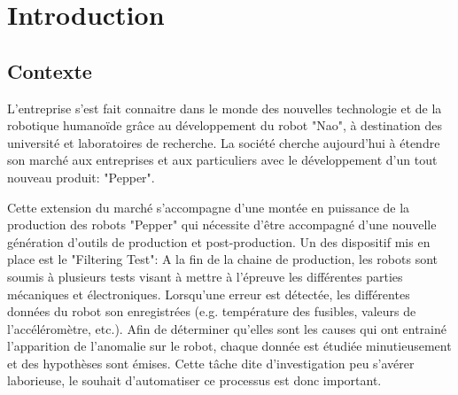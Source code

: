 \chapter{Introduction}
\label{Introduction}
\thispagestyle{fancy}

\section{Contexte}
\label{Introduction:Contexte}

 L'entreprise s'est fait connaitre dans le monde des nouvelles technologie et de la robotique humanoïde grâce au développement du robot "Nao", à destination des université et laboratoires de recherche. La société cherche aujourd'hui à étendre son marché aux entreprises et aux particuliers avec le développement d'un tout nouveau produit: "Pepper". 
 
 Cette extension du marché s'accompagne d'une montée en puissance de la production des robots "Pepper" qui nécessite d'être accompagné d'une nouvelle génération d'outils de production et post-production. Un des dispositif mis en place est le "Filtering Test": A la fin de la chaine de production, les robots sont soumis à plusieurs tests visant à mettre à l'épreuve les différentes parties mécaniques et électroniques. Lorsqu'une erreur est détectée,  les différentes données du robot son enregistrées (e.g. température des fusibles, valeurs de l'accéléromètre, etc.). Afin de déterminer qu'elles sont les causes qui ont entrainé l'apparition de l'anomalie sur le robot, chaque donnée est étudiée minutieusement et des hypothèses sont émises. Cette tâche dite d'investigation peu s'avérer laborieuse, le souhait d'automatiser ce processus est donc important.